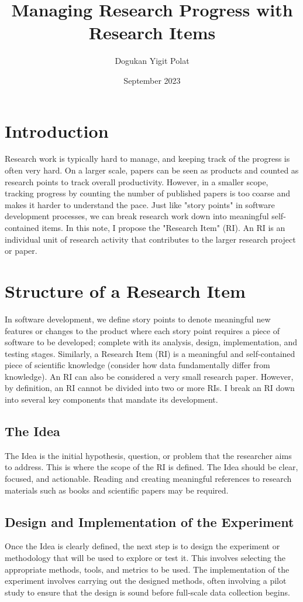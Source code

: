 \documentclass{article}
\title{Managing Research Progress with Research Items}
\author{Dogukan Yigit Polat}
\date{September 2023}
\begin{document}
\maketitle

\section{Introduction}
Research work is typically hard to manage, and keeping track of the progress is often very hard. On a larger scale, papers can be seen as products and counted as research points to track overall productivity. However, in a smaller scope, tracking progress by counting the number of published papers is too coarse and makes it harder to understand the pace. Just like "story points" in software development processes, we can break research work down into meaningful self-contained items. In this note, I propose the "Research Item" (RI). An RI is an individual unit of research activity that contributes to the larger research project or paper. 

\section{Structure of a Research Item}
In software development, we define story points to denote meaningful new features or changes to the product where each story point requires a piece of software to be developed; complete with its analysis, design, implementation, and testing stages. Similarly, a Research Item (RI) is a meaningful and self-contained piece of scientific knowledge (consider how data fundamentally differ from knowledge). An RI can also be considered a very small research paper. However, by definition, an RI cannot be divided into two or more RIs. I break an RI down into several key components that mandate its development.

\subsection{The Idea}
The Idea is the initial hypothesis, question, or problem that the researcher aims to address. This is where the scope of the RI is defined. The Idea should be clear, focused, and actionable. Reading and creating meaningful references to research materials such as books and scientific papers may be required. 

\subsection{Design and Implementation of the Experiment}
Once the Idea is clearly defined, the next step is to design the experiment or methodology that will be used to explore or test it. This involves selecting the appropriate methods, tools, and metrics to be used. The implementation of the experiment involves carrying out the designed methods, often involving a pilot study to ensure that the design is sound before full-scale data collection begins.
\end{document}
